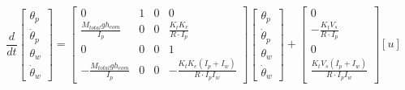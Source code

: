 \documentclass{article}
\begin{document}
$$
\frac{d}{dt}
\begin{bmatrix} \theta_p \\ \dot{\theta}_p \\ \theta_w \\ \dot{\theta}_w \end{bmatrix}
=
\begin{bmatrix}
0 & 1 & 0 & 0 \\
\frac{M_{total} g h_{com}}{I_p} & 0 & 0 & \frac{K_t K_e}{R \cdot I_p} \\
0 & 0 & 0 & 1 \\
-\frac{M_{total} g h_{com}}{I_p} & 0 & 0 & -\frac{K_t K_e (I_p + I_w)}{R \cdot I_p I_w}
\end{bmatrix}
\begin{bmatrix} \theta_p \\ \dot{\theta}_p \\ \theta_w \\ \dot{\theta}_w \end{bmatrix}
+
\begin{bmatrix}
0 \\
-\frac{K_t V_s}{R \cdot I_p} \\
0 \\
\frac{K_t V_s (I_p + I_w)}{R \cdot I_p I_w}
\end{bmatrix}
[u]
$$
\end{document}
